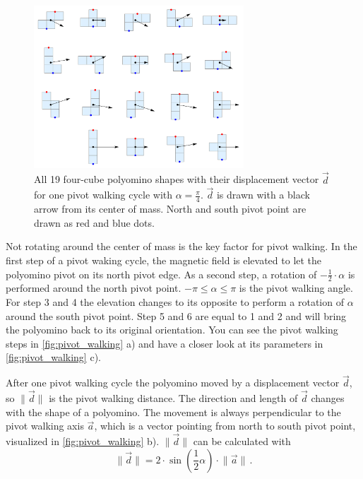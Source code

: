 \begin{figure}
	\centering
	\includegraphics[width=0.70\textwidth]{figures/displacement_pivot_walking.pdf}
	\caption[Polyomino shapes with different displacement vectors]{All 19 four-cube polyomino shapes with their displacement vector $\vec{d}$ for one pivot walking cycle with $\alpha = \frac{\pi}{4}$. $\vec{d}$ is drawn with a black arrow from its center of mass. North and south pivot point are drawn as red and blue dots.}
	\label{fig:displacement_pivot_walking}
\end{figure}

Not rotating around the center of mass is the key factor for pivot walking.
In the first step of a pivot waking cycle, the magnetic field is elevated to let the polyomino pivot on its north pivot edge.
As a second step, a rotation of $-\frac{1}{2} \cdot \alpha$ is performed around the north pivot point.
$-\pi \leq \alpha \leq \pi$ is the pivot walking angle.
For step 3 and 4 the elevation changes to its opposite to perform a rotation of $\alpha$ around the south pivot point.
Step 5 and 6 are equal to 1 and 2 and will bring the polyomino back to its original orientation.
You can see the pivot walking steps in \autoref{fig:pivot_walking} a) and have a closer look at its parameters in \autoref{fig:pivot_walking} c).

After one pivot walking cycle the polyomino moved by a displacement vector $\vec{d}$, so $\lVert \vec{d} \rVert$ is the pivot walking distance.
The direction and length of $\vec{d}$ changes with the shape of a polyomino.
The movement is always perpendicular to the pivot walking axis $\vec{a}$, which is a vector pointing from north to south pivot point, visualized in \autoref{fig:pivot_walking} b).
$\lVert \vec{d} \rVert$ can be calculated with
\begin{equation}\label{eq:pwalk_dist}
\lVert \vec{d} \rVert = 2 \cdot \sin\left(\frac{1}{2} \alpha \right) \cdot \lVert \vec{a} \rVert \,.
\end{equation}

